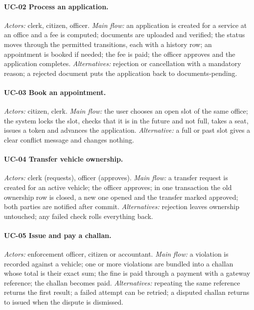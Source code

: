 \paragraph{UC-02 Process an application.}
\emph{Actors:} clerk, citizen, officer. \emph{Main flow:} an application is created for
a service at an office and a fee is computed; documents are uploaded and verified;
the status moves through the permitted transitions, each with a history row; an
appointment is booked if needed; the fee is paid; the officer approves and the
application completes. \emph{Alternatives:} rejection or cancellation with a mandatory
reason; a rejected document puts the application back to documents-pending.

\paragraph{UC-03 Book an appointment.}
\emph{Actors:} citizen, clerk. \emph{Main flow:} the user chooses an open slot of the
same office; the system locks the slot, checks that it is in the future and not full,
takes a seat, issues a token and advances the application. \emph{Alternative:} a full
or past slot gives a clear conflict message and changes nothing.

\paragraph{UC-04 Transfer vehicle ownership.}
\emph{Actors:} clerk (requests), officer (approves). \emph{Main flow:} a transfer
request is created for an active vehicle; the officer approves; in one transaction the
old ownership row is closed, a new one opened and the transfer marked approved; both
parties are notified after commit. \emph{Alternatives:} rejection leaves ownership
untouched; any failed check rolls everything back.

\paragraph{UC-05 Issue and pay a challan.}
\emph{Actors:} enforcement officer, citizen or accountant. \emph{Main flow:} a violation
is recorded against a vehicle; one or more violations are bundled into a challan whose
total is their exact sum; the fine is paid through a payment with a gateway reference;
the challan becomes paid. \emph{Alternatives:} repeating the same reference returns the
first result; a failed attempt can be retried; a disputed challan returns to issued
when the dispute is dismissed.

